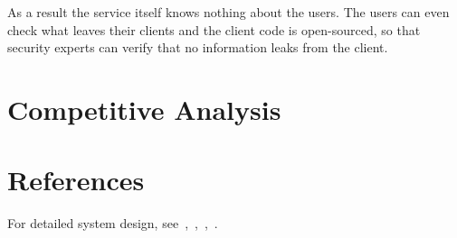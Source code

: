 \documentclass[a4paper, twoside, 10pt]{article}
\begin{document}
As a result the service itself knows nothing about the users. The users can even check what leaves their clients and the client code is open-sourced, so that security experts can 
verify that no information leaks from the client.

\section{Competitive Analysis}

\section{References}
For detailed system design, see~\cite{data_structure_spec},~\cite{flow_spec},~\cite{UI_spec},~\cite{crypto_spec}.



\end{document}
